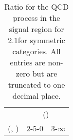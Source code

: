 \begin{table}[h!]
\tiny
\centering
\caption{Ratio for the QCD process in the signal region for 2.1\ifb for symmetric categories. All entries are non-zero but are truncated to one decimal place.\label{tab:ratiosep_sig_qcd_sym}}
\begin{tabular}
{ccc}
	\hline\hline
	& \multicolumn{2}{c}{\scalht (\gev)} \\ 
	 (\njet,  \nb) & 2-5-0 & 3-$\infty$ \\ [0.8ex] 
\hline
	\hline
	\hline
\end{tabular}
\end{table}
